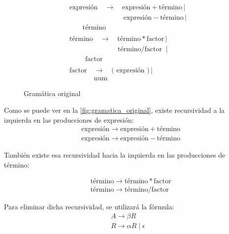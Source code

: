 \documentclass[a4paper,twocolumn]{article}
\begin{document}
    \begin{figure}[hbtp]
        \begin{gather}
            \text{expresión} \quad \rightarrow \quad \text{expresión} + \text{término} \, \vert  \\
            \qquad \qquad \qquad \quad \; \; \; \text{expresión} - \text{término} \, \vert \\
            \quad \; \; \, \, \text{término} \\
            \nonumber\\
            \text{término} \quad \rightarrow \quad \text{término} * \text{factor} \, \vert \\
            \qquad \qquad \qquad \quad   \text{término} / \text{factor} \: \,\, \vert \\
            \quad \quad  \; \text{factor} \\
            \nonumber\\
            \text{factor} \quad \rightarrow \quad \text{( expresión )} \, \vert \\
            \qquad \quad \;  \; \text{num}
        \end{gather}
        \caption{Gramática original}
        \label{fig:gramatica_original}
    \end{figure}


    Como se puede ver en la \autoref{fig:gramatica_original}, existe recursividad a la izquierda en las producciones de expresión:
    \begin{align}
        &\text{expresión} \rightarrow \text{expresión} + \text{término} \\
        &\text{expresión} \rightarrow \text{expresión} - \text{término}
    \end{align}

    También existe esa recursividad hacia la izquierda en las producciones de término:

    \begin{align}
        &\text{término} \rightarrow \text{término} * \text{factor} \\
        &\text{término} \rightarrow \text{término} / \text{factor}
    \end{align}

    Para eliminar dicha recursividad, se utilizará la fórmula\cite{librodragon}:
    \begin{gather*}
        A \rightarrow \beta R\\
        R \rightarrow \alpha R \; \vert \; \epsilon
    \end{gather*}
\end{document}
